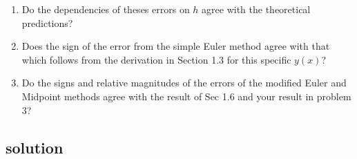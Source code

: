 \documentclass[letterpaper,10pt,english]{/Library/Python/2.7/site-packages/Sphinx-1.2-py2.7.egg/sphinx/texinputs/sphinxhowto}
\begin{document}
\begin{enumerate}
\def\labelenumi{\arabic{enumi}.}
\item
  Do the dependencies of theses errors on $h$ agree with the theoretical
  predictions?
\item
  Does the sign of the error from the simple Euler method agree with
  that which follows from the derivation in Section 1.3 for this
  specific $y(x)$?
\item
  Do the signs and relative magnitudes of the errors of the modified
  Euler and Midpoint methods agree with the result of Sec 1.6 and your
  result in problem 3?
\end{enumerate}\subsection{solution}

\end{document}
